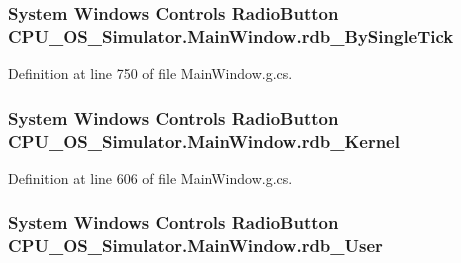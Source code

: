 \subsubsection[{rdb\+\_\+\+By\+Single\+Tick}]{\setlength{\rightskip}{0pt plus 5cm}System Windows Controls Radio\+Button C\+P\+U\+\_\+\+O\+S\+\_\+\+Simulator.\+Main\+Window.\+rdb\+\_\+\+By\+Single\+Tick\hspace{0.3cm}{\ttfamily [package]}}\label{class_c_p_u___o_s___simulator_1_1_main_window_ab40dcb618f5398ab67213476fe1b86ca}


Definition at line 750 of file Main\+Window.\+g.\+cs.

\hypertarget{class_c_p_u___o_s___simulator_1_1_main_window_a549c6be690b051f4ab15dce643dec656}{}
\subsubsection[{rdb\+\_\+\+Kernel}]{\setlength{\rightskip}{0pt plus 5cm}System Windows Controls Radio\+Button C\+P\+U\+\_\+\+O\+S\+\_\+\+Simulator.\+Main\+Window.\+rdb\+\_\+\+Kernel\hspace{0.3cm}{\ttfamily [package]}}\label{class_c_p_u___o_s___simulator_1_1_main_window_a549c6be690b051f4ab15dce643dec656}


Definition at line 606 of file Main\+Window.\+g.\+cs.

\hypertarget{class_c_p_u___o_s___simulator_1_1_main_window_ab9e8d52c337bc24a24d8282dfbf449c8}{}
\subsubsection[{rdb\+\_\+\+User}]{\setlength{\rightskip}{0pt plus 5cm}System Windows Controls Radio\+Button C\+P\+U\+\_\+\+O\+S\+\_\+\+Simulator.\+Main\+Window.\+rdb\+\_\+\+User\hspace{0.3cm}{\ttfamily [package]}}\label{class_c_p_u___o_s___simulator_1_1_main_window_ab9e8d52c337bc24a24d8282dfbf449c8}


